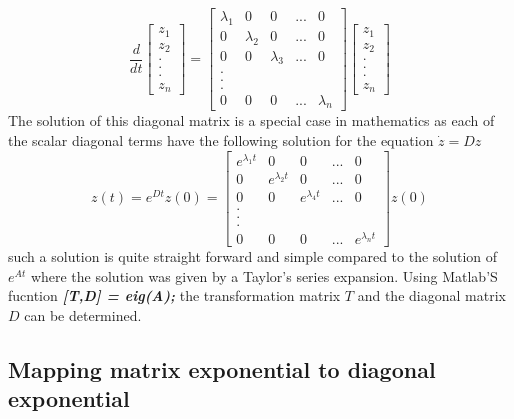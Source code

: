 \begin{equation}
	\frac{d}{dt}\begin{bmatrix}
		z_{1} \\ z_{2} \\ . \\ . \\ . \\ z_{n}
	\end{bmatrix} = \begin{bmatrix}
		\lambda_{1} & 0 & 0 & ... & 0 \\ 0 & \lambda_{2} & 0 & ... & 0 \\ 0 & 0 & \lambda_{3} & ... & 0 \\ . \\. \\. \\ 0 & 0 & 0 & ... & \lambda_{n}
	\end{bmatrix}\begin{bmatrix}
	z_{1} \\ z_{2} \\ . \\ . \\ . \\ z_{n}
	\end{bmatrix}
\end{equation}
The solution of this diagonal matrix is a special case in mathematics as each of the scalar diagonal terms have the following solution for the equation $\dot{z} = Dz$
\begin{equation}
	z(t) = e^{Dt}z(0) = \begin{bmatrix}
		e^{\lambda_{1} t} & 0 & 0 & ... & 0 \\ 0 & e^{\lambda_{2} t} & 0 & ... & 0 \\ 0 & 0 & e^{\lambda_{4} t} & ... & 0 \\ . \\. \\. \\ 0 & 0 & 0 & ... & e^{\lambda_{n} t}
	\end{bmatrix}z(0)
\end{equation}
such a solution is quite straight forward and simple compared to the solution of $e^{At}$ where the solution was given by a Taylor's series expansion. Using Matlab'S fucntion \textbf{\textit{[T,D] = eig(A);}} the transformation matrix $T$ and the diagonal matrix $D$ can be determined.

\subsection{Mapping matrix exponential to diagonal exponential}

